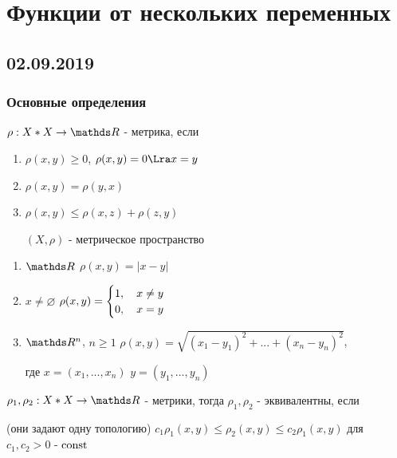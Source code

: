 \documentclass[main]{subfiles}
\begin{document}
  \section{Функции от нескольких переменных}
  \subsection{02.09.2019}
  \subsubsection{Основные определения}

  \begin{definition}
      $\rho: X * X \ra \R$ - метрика, если
      \begin{enumerate}
        \item $\rho(x,y) \geqslant 0$, $\rho(x,y)=0 \Lra x=y$
        \item $\rho(x,y)=\rho(y,x)$
        \item $\rho(x,y) \leqslant \rho(x,z)+\rho(z,y)$

        $(X,\rho)$ - метрическое пространство
    \end{enumerate}
  \end{definition}

  \begin{examples}
      \begin{enumerate}
          \item $\R$ $\rho(x,y)=|x-y|$
          \item $x \neq \varnothing$ $\rho(x,y)=
              \begin{cases}
                  1, \quad x \neq y\\
                  0, \quad x=y
              \end{cases}$
          \item $\R^n$, $n \geqslant 1$ $\rho(x,y)=\sqrt{(x_1-y_1)^2+...+(x_n-y_n)^2}$,

          где $x=(x_1,...,x_n)$ $y=(y_1,...,y_n)$
      \end{enumerate}
  \end{examples}

  \begin{definition}
      $\rho_1, \rho_2: X*X \ra \R$ - метрики, тогда $\rho_1, \rho_2$ - эквивалентны, если

      (они задают одну топологию) $c_1 \rho_1 (x,y) \leqslant \rho_2 (x,y) \leqslant c_2 \rho_1(x,y)$ для $c_1,c_2>0$ - $\mathop{\rm const}\nolimits$
  \end{definition}
\end{document}
